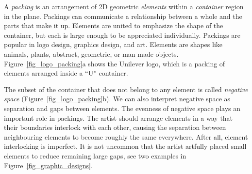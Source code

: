 



\newtext
{
A \textit{packing} is an arrangement of 2D geometric
\textit{elements} within a \textit{container} region in the plane.
Packings can communicate a relationship between a whole and the parts that make it up.
Elements are united to emphasize the shape of the container,
but each is large enough to be appreciated individually.
Packings are popular in logo design, graphics design, and art.
Elements are shapes like animals, plants, abstract, geometric, or man-made objects.
Figure~\ref{fig_logo_packing}a shows the Unilever logo,
which is a packing of elements arranged inside a ``U'' container.
}

\newtext
{
The subset of the container that does not belong to any element is
called \textit{negative space} (Figure~\ref{fig_logo_packing}b).
We can also interpret negative space as separation and gaps between elements.
The evenness of negative space plays an important role in  packings.  
The artist should arrange elements in a way that their boundaries interlock with each other,
causing the separation between neighbouring elements to become roughly the same everywhere.
After all, element interlocking is imperfect. It is not uncommon that 
the artist artfully placed small elements to reduce remaining large gaps,
see two examples in Figure~\ref{fig_graphic_designs}.
}

